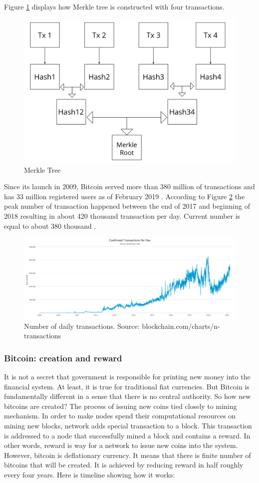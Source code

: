 \documentclass[conference,compsoc]{IEEEtran}
\begin{document}
Figure \ref{fig:fig7} displays how Merkle tree is constructed with four transactions.

\begin{figure}[h!]
  \centering
  \includegraphics[width=.45\textwidth]{graphics/merkle.png}
  \caption{Merkle Tree}
  \label{fig:fig7}
\end{figure}

Since its launch in 2009, Bitcoin served more than 380 million of transactions and has 33 million registered users as of February 2019 \cite{blockchain}. According to Figure \ref{fig:fig8} the peak number of transaction happened between the end of 2017 and beginning of 2018 resulting in about 420 thousand transaction per day. Current number is equal to about 380 thousand \cite{blockchain}. 

\begin{figure}[h!]
  \centering
  \includegraphics[width=.45\textwidth]{graphics/confirmed_tx.png}
  \caption[Caption]{Number of daily transactions. Source: blockchain.com/charts/n-transactions}
  \label{fig:fig8}
\end{figure}

\subsubsection{Bitcoin: creation and reward}
It is not a secret that government is responsible for printing new money into the financial system. 
At least, it is true for traditional fiat currencies.
But Bitcoin is fundamentally different in a sense that there is no central authority.
So how new bitcoins are created?
The process of issuing new coins tied closely to mining mechanism. 
In order to make nodes spend their computational resources on mining new blocks, network adds special transaction to a block. 
This transaction is addressed to a node that successfully mined a block and contains a reward. 
In other words, reward is way for a network to issue new coins into the system. 
However, bitcoin is deflationary currency. 
It means that there is finite number of bitcoins that will be created. 
It is achieved by reducing reward in half roughly every four years. 
Here is timeline showing how it works:
\end{document}
